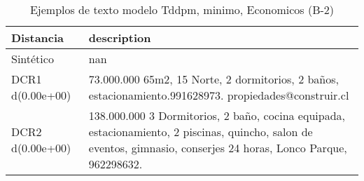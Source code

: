 \begin{table}[H]
\centering
\fontsize{10}{14}\selectfont
\caption{Ejemplos de texto modelo Tddpm, minimo, Economicos (B-2)}
\label{table-example-economicos-b-2-tddpm_mlp-min-text}
\begin{tabular}{|l|m{35em}|}
\hline
\rowcolor[gray]{0.8}
Distancia & description \\
\hline Sintético & nan \\
\hline DCR1 d(0.00e+00) & 73.000.000 65m2, 15 Norte, 2 dormitorios, 2 ba\~nos, estacionamiento.991628973. propiedades@construir.cl \\
\hline DCR2 d(0.00e+00) & 138.000.000 3 Dormitorios, 2 ba\~no, cocina equipada, estacionamiento, 2 piscinas, quincho, salon de eventos, gimnasio, conserjes 24 horas, Lonco Parque, 962298632. \\
\hline
\end{tabular}
\end{table}
